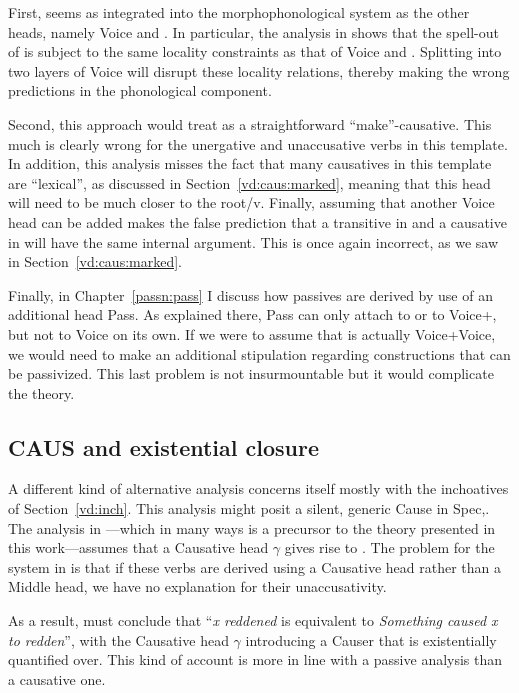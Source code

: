 First, {\vd} seems as integrated into the morphophonological system as the other heads, namely Voice and {\vz}. In particular, the analysis in \cite{kastner18nllt} shows that the spell-out of {\vd} is subject to the same locality constraints as that of Voice and {\vz}. Splitting {\vd} into two layers of Voice will disrupt these locality relations, thereby making the wrong predictions in the phonological component.

Second, this approach would treat {\thif} as a straightforward ``make''-causative. This much is clearly wrong for the unergative and unaccusative verbs in this template. In addition, this analysis misses the fact that many causatives in this template are ``lexical'', as discussed in Section~\ref{vd:caus:marked}, meaning that this head will need to be much closer to the root/v. Finally, assuming that another Voice head can be added makes the false prediction that a transitive in {\tkal} and a causative in {\thif} will have the same internal argument. This is once again incorrect, as we saw in Section~\ref{vd:caus:marked}.

Finally, in Chapter~\ref{passn:pass} I discuss how passives are derived by use of an additional head Pass. As explained there, Pass can only attach to {\vd} or to Voice+{\va}, but not to Voice on its own. If we were to assume that {\vd} is actually Voice+Voice, we would need to make an additional stipulation regarding constructions that can be passivized. This last problem is not insurmountable but it would complicate the theory.

	
	\subsection{CAUS and existential closure} \label{vd:others:ed}
A different kind of alternative analysis concerns itself mostly with the inchoatives of Section~\ref{vd:inch}. This analysis might posit a silent, generic Cause in Spec,{\vd}. The analysis in \citet[61]{doron03}---which in many ways is a precursor to the theory presented in this work---assumes that a Causative head $\gamma$ gives rise to {\thif}. The problem for the system in \cite{doron03} is that if these verbs are derived using a Causative head rather than a Middle head, we have no explanation for their unaccusativity.

As a result, \citet[62]{doron03} must conclude that ``\emph{x reddened} is equivalent to \emph{Something caused x to redden}'', with the Causative head $\gamma$ introducing a Causer that is existentially quantified over. This kind of account is more in line with a passive analysis than a causative one.

